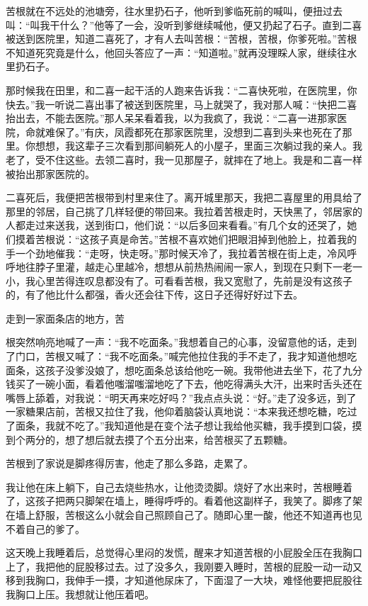 \documentclass[12pt,UTF8]{ctexbook}
\begin{document}
苦根就在不远处的池塘旁，往水里扔石子，他听到爹临死前的喊叫，便扭过去叫：“叫我干什么？”他等了一会，没听到爹继续喊他，便又扔起了石子。直到二喜被送到医院里，知道二喜死了，才有人去叫苦根：“苦根，苦根，你爹死啦。”苦根不知道死究竟是什么，他回头答应了一声：“知道啦。”就再没理睬人家，继续往水里扔石子。

那时候我在田里，和二喜一起干活的人跑来告诉我：“二喜快死啦，在医院里，你快去。”我一听说二喜出事了被送到医院里，马上就哭了，我对那人喊：“快把二喜抬出去，不能去医院。”那人呆呆看着我，以为我疯了，我说：“二喜一进那家医院，命就难保了。”有庆，凤霞都死在那家医院里，没想到二喜到头来也死在了那里。你想想，我这辈子三次看到那间躺死人的小屋子，里面三次躺过我的亲人。我老了，受不住这些。去领二喜时，我一见那屋子，就摔在了地上。我是和二喜一样被抬出那家医院的。

二喜死后，我便把苦根带到村里来住了。离开城里那天，我把二喜屋里的用具给了那里的邻居，自己挑了几样轻便的带回来。我拉着苦根走时，天快黑了，邻居家的人都走过来送我，送到街口，他们说：“以后多回来看看。”有几个女的还哭了，她们摸着苦根说：“这孩子真是命苦。”苦根不喜欢她们把眼泪掉到他脸上，拉着我的手一个劲地催我：“走呀，快走呀。”那时候天冷了，我拉着苦根在街上走，冷风呼呼地往脖子里灌，越走心里越冷，想想从前热热闹闹一家人，到现在只剩下一老一小，我心里苦得连叹息都没有了。可看看苦根，我又宽慰了，先前是没有这孩子的，有了他比什么都强，香火还会往下传，这日子还得好好过下去。

走到一家面条店的地方，苦


根突然响亮地喊了一声：“我不吃面条。”我想着自己的心事，没留意他的话，走到了门口，苦根又喊了：“我不吃面条。”喊完他拉住我的手不走了，我才知道他想吃面条，这孩子没爹没娘了，想吃面条总该给他吃一碗。我带他进去坐下，花了九分钱买了一碗小面，看着他嗤溜嗤溜地吃了下去，他吃得满头大汗，出来时舌头还在嘴唇上舔着，对我说：“明天再来吃好吗？”我点点头说：“好。”走了没多远，到了一家糖果店前，苦根又拉住了我，他仰着脑袋认真地说：“本来我还想吃糖，吃过了面条，我就不吃了。”我知道他是在变个法子想让我给他买糖，我手摸到口袋，摸到个两分的，想了想后就去摸了个五分出来，给苦根买了五颗糖。

苦根到了家说是脚疼得厉害，他走了那么多路，走累了。

我让他在床上躺下，自己去烧些热水，让他烫烫脚。烧好了水出来时，苦根睡着了，这孩子把两只脚架在墙上，睡得呼呼的。看着他这副样子，我笑了。脚疼了架在墙上舒服，苦根这么小就会自己照顾自己了。随即心里一酸，他还不知道再也见不着自己的爹了。

这天晚上我睡着后，总觉得心里闷的发慌，醒来才知道苦根的小屁股全压在我胸口上了，我把他的屁股移过去。过了没多久，我刚要入睡时，苦根的屁股一动一动又移到我胸口，我伸手一摸，才知道他尿床了，下面湿了一大块，难怪他要把屁股往我胸口上压。我想就让他压着吧。
\end{document}
